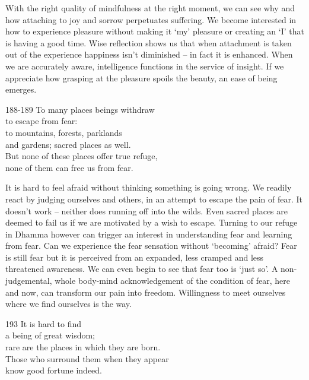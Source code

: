 \begin{dhpRefl}

With the right quality of mindfulness at the right moment, we can see
why and how attaching to joy and sorrow perpetuates suffering. We
become interested in how to experience pleasure without making it
`my' pleasure or creating an `I' that is having a good time. Wise
reflection shows us that when attachment is taken out of the
experience happiness isn't diminished -- in fact it is enhanced. When
we are accurately aware, intelligence functions in the service of
insight. If we appreciate how grasping at the pleasure spoils the
beauty, an ease of being emerges.

\end{dhpRefl}


\begin{dhpVerse}{188-189}
\label{dhp-188}\label{dhp-189}
To many places beings withdraw\\
to escape from fear:\\
to mountains, forests, parklands\\
and gardens; sacred places as well.\\
But none of these places offer true refuge,\\
none of them can free us from fear.
\end{dhpVerse}

\begin{dhpRefl}

It is hard to feel afraid without thinking something is going wrong.
We readily react by judging ourselves and others, in an attempt to
escape the pain of fear. It doesn't work -- neither does running off
into the wilds. Even sacred places are deemed to fail us if we are
motivated by a wish to escape. Turning to our refuge in Dhamma
however can trigger an interest in understanding fear and learning
from fear. Can we experience the fear sensation without `becoming'
afraid? Fear is still fear but it is perceived from an expanded, less
cramped and less threatened awareness. We can even begin to see that
fear too is `just so'. A non-judgemental, whole body-mind
acknowledgement of the condition of fear, here and now, can transform
our pain into freedom. Willingness to meet ourselves where we find
ourselves is the way.

\end{dhpRefl}


\begin{dhpVerse}{193}
\label{dhp-193}
It is hard to find\\
a being of great wisdom;\\
rare are the places in which they are born.\\
Those who surround them when they appear\\
know good fortune indeed.
\end{dhpVerse}

